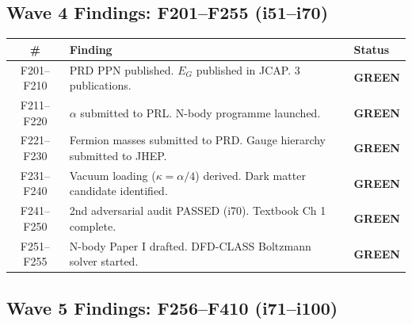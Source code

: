 \documentclass[11pt,a4paper]{article}
\newcommand{\GREEN}{\textcolor{dfdgreen}{\textbf{GREEN}}}
\begin{document}
\subsection{Wave 4 Findings: F201--F255 (i51--i70)}

\begin{longtable}{cp{11cm}l}
\toprule
\textbf{\#} & \textbf{Finding} & \textbf{Status} \\
\midrule
\endfirsthead
F201--F210 & PRD PPN published. $E_G$ published in JCAP. 3 publications. & \GREEN \\
F211--F220 & $\alpha$ submitted to PRL. N-body programme launched. & \GREEN \\
F221--F230 & Fermion masses submitted to PRD. Gauge hierarchy submitted to JHEP. & \GREEN \\
F231--F240 & Vacuum loading ($\kappa = \alpha/4$) derived. Dark matter candidate identified. & \GREEN \\
F241--F250 & 2nd adversarial audit PASSED (i70). Textbook Ch 1 complete. & \GREEN \\
F251--F255 & N-body Paper I drafted. DFD-CLASS Boltzmann solver started. & \GREEN \\
\bottomrule
\end{longtable}

\subsection{Wave 5 Findings: F256--F410 (i71--i100)}
\end{document}
